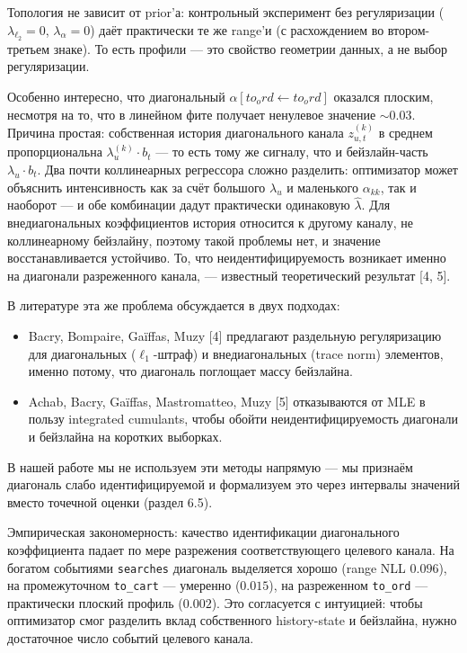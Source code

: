 \documentclass[12pt,a4paper]{article}
\begin{document}
Топология не зависит от prior'а: контрольный эксперимент без регуляризации ($\lambda _{\ell_2} = 0$, $\lambda _\alpha  = 0$) даёт практически те же range'и (с расхождением во втором-третьем знаке). То есть профили --- это свойство геометрии данных, а не выбор регуляризации.

Особенно интересно, что диагональный $\alpha [to_ord \leftarrow  to_ord]$ оказался плоским, несмотря на то, что в линейном фите получает ненулевое значение $\sim 0.03$. Причина простая: собственная история диагонального канала $z_{u,t}^{(k)}$ в среднем пропорциональна $\lambda _u^{(k)} \cdot  b_t$ --- то есть тому же сигналу, что и бейзлайн-часть $\lambda _u \cdot  b_t$. Два почти коллинеарных регрессора сложно разделить: оптимизатор может объяснить интенсивность как за счёт большого $\lambda _u$ и маленького $\alpha _{kk}$, так и наоборот --- и обе комбинации дадут практически одинаковую $\hat{\lambda}$. Для внедиагональных коэффициентов история относится к другому каналу, не коллинеарному бейзлайну, поэтому такой проблемы нет, и значение восстанавливается устойчиво. То, что неидентифицируемость возникает именно на диагонали разреженного канала, --- известный теоретический результат [4, 5].

В литературе эта же проблема обсуждается в двух подходах:

\begin{itemize}
  \item Bacry, Bompaire, Gaïffas, Muzy [4] предлагают раздельную регуляризацию для диагональных ($\ell _1$-штраф) и внедиагональных (trace norm) элементов, именно потому, что диагональ поглощает массу бейзлайна.
  \item Achab, Bacry, Gaïffas, Mastromatteo, Muzy [5] отказываются от MLE в пользу integrated cumulants, чтобы обойти неидентифицируемость диагонали и бейзлайна на коротких выборках.
\end{itemize}


В нашей работе мы не используем эти методы напрямую --- мы признаём диагональ слабо идентифицируемой и формализуем это через интервалы значений вместо точечной оценки (раздел 6.5).

Эмпирическая закономерность: качество идентификации диагонального коэффициента падает по мере разрежения соответствующего целевого канала. На богатом событиями \texttt{searches} диагональ выделяется хорошо (range NLL $0.096$), на промежуточном \texttt{to\_cart} --- умеренно ($0.015$), на разреженном \texttt{to\_ord} --- практически плоский профиль ($0.002$). Это согласуется с интуицией: чтобы оптимизатор смог разделить вклад собственного history-state и бейзлайна, нужно достаточное число событий целевого канала.
\end{document}
